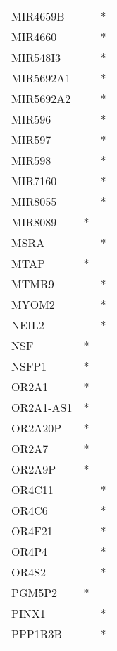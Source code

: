 \begin{longtable}{lcc}
MIR4659B     &                &          * \\
MIR4660      &                &          * \\
MIR548I3     &                &          * \\
MIR5692A1    &                &          * \\
MIR5692A2    &                &          * \\
MIR596       &                &          * \\
MIR597       &                &          * \\
MIR598       &                &          * \\
MIR7160      &                &          * \\
MIR8055      &                &          * \\
MIR8089      &              * &            \\
MSRA         &                &          * \\
MTAP         &              * &            \\
MTMR9        &                &          * \\
MYOM2        &                &          * \\
NEIL2        &                &          * \\
NSF          &              * &            \\
NSFP1        &              * &            \\
OR2A1        &              * &            \\
OR2A1-AS1    &              * &            \\
OR2A20P      &              * &            \\
OR2A7        &              * &            \\
OR2A9P       &              * &            \\
OR4C11       &                &          * \\
OR4C6        &                &          * \\
OR4F21       &                &          * \\
OR4P4        &                &          * \\
OR4S2        &                &          * \\
PGM5P2       &              * &            \\
PINX1        &                &          * \\
PPP1R3B      &                &          * \\

\end{longtable}

